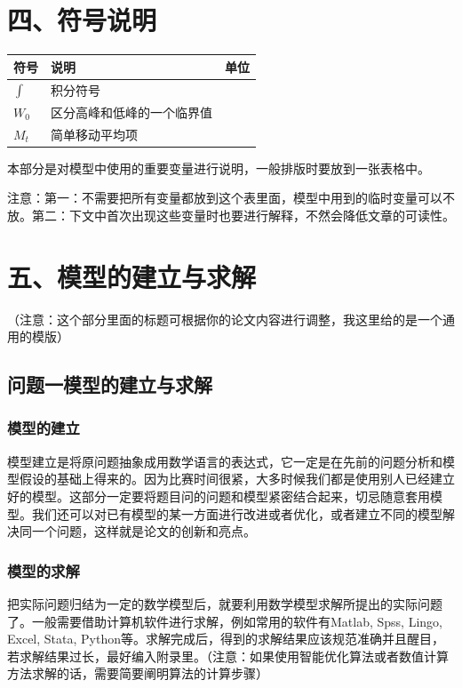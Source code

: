 \documentclass{my_paper}
\begin{document}
\section{四、符号说明}
\begin{table}[h]%
    \centering
    \begin{tabular}{p{2.0cm}<{\centering}p{9.0cm}<{\centering}p{2.0cm}<{\centering}}
    \hline
    符号 & 说明 & 单位 \\ %
    \hline
    $\int$ & 积分符号 &  \\ %
    $W_0$ & 区分高峰和低峰的一个临界值 &  \\ %
    $M_t$ &  简单移动平均项 &  \\ %
    \hline
    \end{tabular}
\end{table}
本部分是对模型中使用的重要变量进行说明，一般排版时要放到一张表格中。

注意：第一：不需要把所有变量都放到这个表里面，模型中用到的临时变量可以不放。第二：下文中首次出现这些变量时也要进行解释，不然会降低文章的可读性。

\section{五、模型的建立与求解}

（注意：这个部分里面的标题可根据你的论文内容进行调整，我这里给的是一个通用的模版）

\subsection{问题一模型的建立与求解}
\subsubsection{模型的建立}
模型建立是将原问题抽象成用数学语言的表达式，它一定是在先前的问题分析和模型假设的基础上得来的。因为比赛时间很紧，大多时候我们都是使用别人已经建立好的模型。这部分一定要将题目问的问题和模型紧密结合起来，切忌随意套用模型。我们还可以对已有模型的某一方面进行改进或者优化，或者建立不同的模型解决同一个问题，这样就是论文的创新和亮点。
\subsubsection{模型的求解}
把实际问题归结为一定的数学模型后，就要利用数学模型求解所提出的实际问题了。一般需要借助计算机软件进行求解，例如常用的软件有Matlab, Spss, Lingo, Excel, Stata, Python等。求解完成后，得到的求解结果应该规范准确并且醒目，若求解结果过长，最好编入附录里。（注意：如果使用智能优化算法或者数值计算方法求解的话，需要简要阐明算法的计算步骤）
\end{document}
